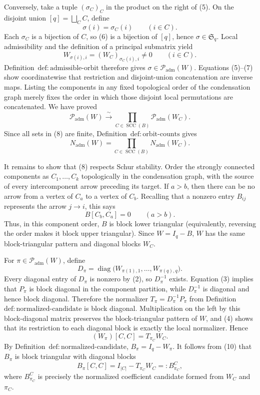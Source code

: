 Conversely, take a tuple \((\sigma_C)_C\) in the product on the right of (5).  On the disjoint union \([q]=\bigsqcup_C C\), define
\[
 \sigma(i)=\sigma_C(i)\qquad(i\in C). \tag{6}
\]
Each \(\sigma_C\) is a bijection of \(C\), so (6) is a bijection of \([q]\), hence \(\sigma\in\mathfrak S_q\).  Local admissibility and the definition of a principal submatrix yield
\[
 W_{\sigma(i),i}=(W_C)_{\sigma_C(i),i}\neq0
 \qquad(i\in C). \tag{7}
\]
Definition~\(\mathrm{def:admissible\text{-}orbit}\) therefore gives \(\sigma\in\mathcal P_{\mathrm{adm}}(W)\).  Equations (5)--(7) show coordinatewise that restriction and disjoint-union concatenation are inverse maps.  Listing the components in any fixed topological order of the condensation graph merely fixes the order in which those disjoint local permutations are concatenated.  We have proved
\[
 \mathcal P_{\mathrm{adm}}(W)
 \xrightarrow{\ \sim\ }
 \prod_{C\in\operatorname{SCC}(B)}
 \mathcal P_{\mathrm{adm}}(W_C). \tag{8}
\]
Since all sets in (8) are finite, Definition~\(\mathrm{def:orbit\text{-}counts}\) gives
\[
 N_{\mathrm{adm}}(W)
 =\prod_{C\in\operatorname{SCC}(B)}N_{\mathrm{adm}}(W_C). \tag{9}
\]

It remains to show that (8) respects Schur stability.  Order the strongly connected components as \(C_1,\ldots,C_k\) topologically in the condensation graph, with the source of every intercomponent arrow preceding its target.  If \(a>b\), then there can be no arrow from a vertex of \(C_a\) to a vertex of \(C_b\).  Recalling that a nonzero entry \(B_{ij}\) represents the arrow \(j\to i\), this says
\[
 B[C_b,C_a]=0\qquad(a>b).
\]
Thus, in this component order, \(B\) is block lower triangular (equivalently, reversing the order makes it block upper triangular).  Since \(W=I_q-B\), \(W\) has the same block-triangular pattern and diagonal blocks \(W_C\).

For \(\pi\in\mathcal P_{\mathrm{adm}}(W)\), define
\[
 D_\pi=\operatorname{diag}\bigl(W_{\pi(1),1},\ldots,
 W_{\pi(q),q}\bigr).
\]
Every diagonal entry of \(D_\pi\) is nonzero by (2), so \(D_\pi^{-1}\) exists.  Equation (3) implies that \(P_\pi\) is block diagonal in the component partition, while \(D_\pi^{-1}\) is diagonal and hence block diagonal.  Therefore the normalizer \(T_\pi=D_\pi^{-1}P_\pi\) from Definition~\(\mathrm{def:normalized\text{-}candidate}\) is block diagonal.  Multiplication on the left by this block-diagonal matrix preserves the block-triangular pattern of \(W\), and (4) shows that its restriction to each diagonal block is exactly the local normalizer.  Hence
\[
 (W_\pi)[C,C]=T_{\pi_C}W_C. \tag{10}
\]
By Definition~\(\mathrm{def:normalized\text{-}candidate}\), \(B_\pi=I_q-W_\pi\).  It follows from (10) that \(B_\pi\) is block triangular with diagonal blocks
\[
 B_\pi[C,C]
 =I_{|C|}-T_{\pi_C}W_C
 =:B^C_{\pi_C}, \tag{11}
\]
where \(B^C_{\pi_C}\) is precisely the normalized coefficient candidate formed from \(W_C\) and \(\pi_C\).

